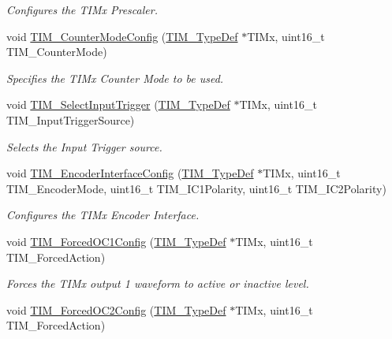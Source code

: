\begin{DoxyCompactItemize}
\begin{DoxyCompactList}\small\item\em Configures the T\+I\+Mx Prescaler. \end{DoxyCompactList}\item 
void \mbox{\hyperlink{group___t_i_m___exported___functions_ga93941c1db20bf3794f377307df90a67b}{T\+I\+M\+\_\+\+Counter\+Mode\+Config}} (\mbox{\hyperlink{struct_t_i_m___type_def}{T\+I\+M\+\_\+\+Type\+Def}} $\ast$T\+I\+Mx, uint16\+\_\+t T\+I\+M\+\_\+\+Counter\+Mode)
\begin{DoxyCompactList}\small\item\em Specifies the T\+I\+Mx Counter Mode to be used. \end{DoxyCompactList}\item 
void \mbox{\hyperlink{group___t_i_m___exported___functions_ga4252583c6ae8a73d6fc66f7e951dbc35}{T\+I\+M\+\_\+\+Select\+Input\+Trigger}} (\mbox{\hyperlink{struct_t_i_m___type_def}{T\+I\+M\+\_\+\+Type\+Def}} $\ast$T\+I\+Mx, uint16\+\_\+t T\+I\+M\+\_\+\+Input\+Trigger\+Source)
\begin{DoxyCompactList}\small\item\em Selects the Input Trigger source. \end{DoxyCompactList}\item 
void \mbox{\hyperlink{group___t_i_m___exported___functions_ga0fc7e76c47a3bd1ba1ebc71427832b51}{T\+I\+M\+\_\+\+Encoder\+Interface\+Config}} (\mbox{\hyperlink{struct_t_i_m___type_def}{T\+I\+M\+\_\+\+Type\+Def}} $\ast$T\+I\+Mx, uint16\+\_\+t T\+I\+M\+\_\+\+Encoder\+Mode, uint16\+\_\+t T\+I\+M\+\_\+\+I\+C1\+Polarity, uint16\+\_\+t T\+I\+M\+\_\+\+I\+C2\+Polarity)
\begin{DoxyCompactList}\small\item\em Configures the T\+I\+Mx Encoder Interface. \end{DoxyCompactList}\item 
void \mbox{\hyperlink{group___t_i_m___exported___functions_ga4f58c12e6493a0d8b9555c9097b831d6}{T\+I\+M\+\_\+\+Forced\+O\+C1\+Config}} (\mbox{\hyperlink{struct_t_i_m___type_def}{T\+I\+M\+\_\+\+Type\+Def}} $\ast$T\+I\+Mx, uint16\+\_\+t T\+I\+M\+\_\+\+Forced\+Action)
\begin{DoxyCompactList}\small\item\em Forces the T\+I\+Mx output 1 waveform to active or inactive level. \end{DoxyCompactList}\item 
void \mbox{\hyperlink{group___t_i_m___exported___functions_ga3d2902b6fbab8dd55cd531055ffcc63d}{T\+I\+M\+\_\+\+Forced\+O\+C2\+Config}} (\mbox{\hyperlink{struct_t_i_m___type_def}{T\+I\+M\+\_\+\+Type\+Def}} $\ast$T\+I\+Mx, uint16\+\_\+t T\+I\+M\+\_\+\+Forced\+Action)

\end{DoxyCompactItemize}
